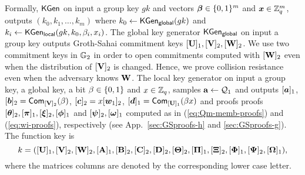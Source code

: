 Formally, $\mathsf{KGen}$ on input a group key $gk$ and vectors ${\boldsymbol{\beta}}\in\{0,1\}^m$ and ${\boldsymbol{x}}\in\mathbb{Z}_q^m$,  outputs $(k_0,k_1,\ldots,k_m)$ where $k_0 \gets \mathsf{KGen}_\mathsf{global}(gk)$ and  $k_i\gets \mathsf{KGen}_{\mathsf{local}}(gk,k_0,\beta_i,\allowbreak x_i)$. The global key generator $\mathsf{KGen}_\mathsf{global}$ on input a group key outputs Groth-Sahai commitment keys $[\mathbf{{U}}]_1,[\mathbf{{V}}]_2,[\mathbf{{W}}]_2$. We use two commitment keys in $\mathbb{G}_2$ in order to open commitments computed with $[\mathbf{{W}}]_2$ even when the distribution of $[\mathbf{{V}}]_2$ is changed. Hence, we prove collision resistance even when the adversary knows $\mathbf{{W}}$. The local key generator on input a group key, a global key, a bit $\beta\in\{0,1\}$ and $x\in\mathbb{Z}_q$, samples $\mathbf{{a}}\gets\mathcal{Q}_1$ and outputs $[{\boldsymbol{a}}]_1$, $[{\boldsymbol{b}}]_2 = \mathsf{Com}_{[\mathbf{{V}}]_2}(\beta)$,  $[{\boldsymbol{c}}]_2 = x[{\boldsymbol{w}}_1]_2$, $[{\boldsymbol{d}}]_1 = \mathsf{Com}_{[\mathbf{{U}}]_1}(\beta x)$ and proofs proofs $[{\boldsymbol{\theta}}]_2,[{\boldsymbol{\pi}}]_1,[{\boldsymbol{\xi}}]_2,[{\boldsymbol{\phi}}]_1$ and $[{\boldsymbol{\psi}}]_2,[{\boldsymbol{\omega}}]_1$ computed as in (\ref{eq:Qm-memb-proofs}) and (\ref{eq:wi-proofs}), respectively (see App.~\ref{sec:GSproofs-h} and \ref{sec:GSproofs-g}). The function key is
$$
k = ([\mathbf{{U}}]_1,[\mathbf{{V}}]_2,[\mathbf{{W}}]_2,[\mathbf{{A}}]_1,[\mathbf{{B}}]_2,[\mathbf{{C}}]_2,[\mathbf{{D}}]_2,[\mathbf{{\Theta}}]_2,[\mathbf{{\Pi}}]_1,
[\mathbf{{\Xi}}]_2,[\mathbf{{\Phi}}]_1,[\mathbf{{\Psi}}]_2,[\mathbf{{\Omega}}]_1),
$$
where the matrices columns are denoted by the corresponding lower case letter.

